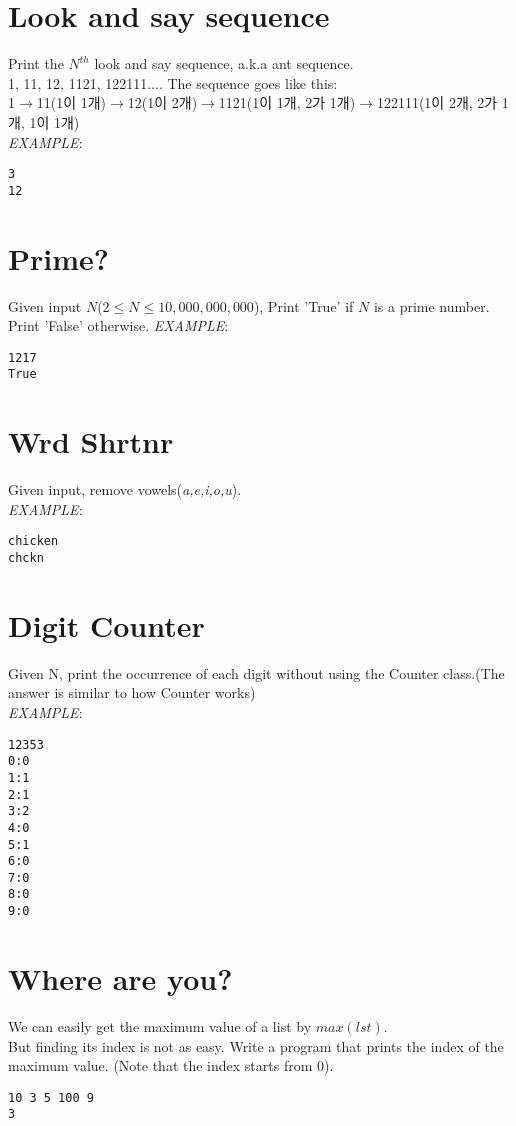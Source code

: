 \documentclass{article}
\begin{document}
\thispagestyle{fancy}
\setcounter{section}{-1}

\section{Look and say sequence}
  Print the $N^{th}$ look and say sequence, a.k.a ant sequence.\\
  1, 11, 12, 1121, 122111....
  The sequence goes like this:\\
  1$\rightarrow$11(1이 
  1개)$\rightarrow$12(1이 2개)$\rightarrow$1121(1이 1개, 2가 1개)$\rightarrow$122111(1이 2개, 2가 1개, 1이 1개)\\
\textit{EXAMPLE}:
\begin{lstlisting}
3
12
\end{lstlisting}

\section{Prime?}
Given input $N$($2\le N \le 10,000,000,000$), Print 'True' if $N$ is a prime number. Print 'False' otherwise. 
\textit{EXAMPLE}:
\begin{lstlisting}
1217
True
\end{lstlisting}

\section{Wrd Shrtnr}
Given input, remove vowels(\textit{a,e,i,o,u}).\\
\textit{EXAMPLE}:
\begin{lstlisting}
chicken
chckn
\end{lstlisting}

\section{Digit Counter}
Given N, print the occurrence of each digit without using the Counter
class.(The answer is similar to how Counter works)\\
\textit{EXAMPLE}:
\begin{lstlisting}
12353
0:0
1:1
2:1
3:2
4:0
5:1
6:0
7:0
8:0
9:0
\end{lstlisting}

\section{Where are you?}
We can easily get the maximum value of a list by $max(lst)$.\\
But finding its index is not as easy. Write a program that prints the index of
the maximum value. (Note that the index starts from 0).
\begin{lstlisting}
10 3 5 100 9
3
\end{lstlisting}
\end{document}
